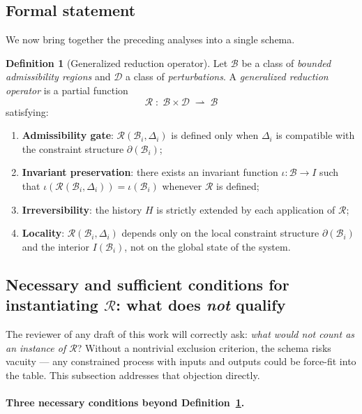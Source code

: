 \documentclass[12pt, a4paper]{article}
\theoremstyle{plain}
\theoremstyle{definition}
\newtheorem{definition}[theorem]{Definition}
\theoremstyle{remark}
\newcommand{\Rcal}{\mathcal{R}}
\newcommand{\Bcal}{\mathcal{B}}
\newcommand{\Dcal}{\mathcal{D}}
\begin{document}
\subsection{Formal statement}

We now bring together the preceding analyses into a single schema.

\begin{definition}[Generalized reduction operator]
\label{def:R}
  Let $\Bcal$ be a class of \emph{bounded admissibility regions} and
  $\Dcal$ a class of \emph{perturbations}.
  A \emph{generalized reduction operator} is a partial function
  \[
    \Rcal \;:\; \Bcal \times \Dcal \;\rightharpoonup\; \Bcal
  \]
  satisfying:
  \begin{enumerate}[label=(\roman*)]
    \item \textbf{Admissibility gate}: $\Rcal(\Bcal_i, \Delta_i)$ is
          defined only when $\Delta_i$ is compatible with the constraint
          structure $\partial(\Bcal_i)$;
    \item \textbf{Invariant preservation}: there exists an invariant
          function $\iota : \Bcal \to I$ such that
          $\iota(\Rcal(\Bcal_i, \Delta_i)) = \iota(\Bcal_i)$
          whenever $\Rcal$ is defined;
    \item \textbf{Irreversibility}: the history $H$ is strictly extended
          by each application of $\Rcal$;
    \item \textbf{Locality}: $\Rcal(\Bcal_i, \Delta_i)$ depends only
          on the local constraint structure $\partial(\Bcal_i)$ and the
          interior $I(\Bcal_i)$, not on the global state of the system.
  \end{enumerate}
\end{definition}

\subsection{Necessary and sufficient conditions for instantiating
  $\Rcal$: what does \emph{not} qualify}

The reviewer of any draft of this work will correctly ask:
\emph{what would not count as an instance of $\Rcal$}?
Without a nontrivial exclusion criterion, the schema risks vacuity —
any constrained process with inputs and outputs could be
force-fit into the table.
This subsection addresses that objection directly.

\paragraph{Three necessary conditions beyond Definition~\ref{def:R}.}
\end{document}
